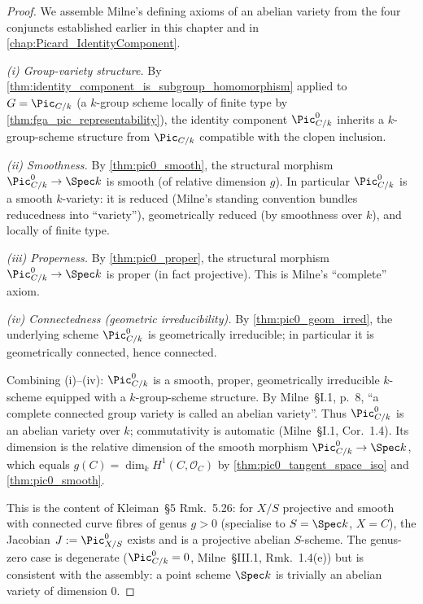\begin{proof}
  We assemble Milne's defining axioms of an abelian variety from the
  four conjuncts established earlier in this chapter and in
  \cref{chap:Picard_IdentityComponent}.

  \emph{(i) Group-variety structure.} By
  \cref{thm:identity_component_is_subgroup_homomorphism} applied to
  \(G = \Pic_{C/k}\) (a \(k\)-group scheme locally of finite type by
  \cref{thm:fga_pic_representability}), the identity component
  \(\Pic^0_{C/k}\) inherits a \(k\)-group-scheme structure from
  \(\Pic_{C/k}\) compatible with the clopen inclusion.

  \emph{(ii) Smoothness.} By \cref{thm:pic0_smooth}, the structural
  morphism \(\Pic^0_{C/k} \to \Spec k\) is smooth (of relative
  dimension \(g\)). In particular \(\Pic^0_{C/k}\) is a smooth
  \(k\)-variety: it is reduced (Milne's standing convention bundles
  reducedness into ``variety''), geometrically reduced (by
  smoothness over \(k\)), and locally of finite type.

  \emph{(iii) Properness.} By \cref{thm:pic0_proper}, the structural
  morphism \(\Pic^0_{C/k} \to \Spec k\) is proper (in fact
  projective). This is Milne's ``complete'' axiom.

  \emph{(iv) Connectedness (geometric irreducibility).} By
  \cref{thm:pic0_geom_irred}, the underlying scheme
  \(\Pic^0_{C/k}\) is geometrically irreducible; in particular it is
  geometrically connected, hence connected.

  Combining (i)--(iv): \(\Pic^0_{C/k}\) is a smooth, proper,
  geometrically irreducible \(k\)-scheme equipped with a
  \(k\)-group-scheme structure. By Milne~\S I.1, p.~8, ``a complete
  connected group variety is called an abelian variety''. Thus
  \(\Pic^0_{C/k}\) is an abelian variety over \(k\); commutativity is
  automatic (Milne~\S I.1, Cor.~1.4). Its dimension is the relative
  dimension of the smooth morphism \(\Pic^0_{C/k} \to \Spec k\),
  which equals \(g(C) = \dim_k H^1(C, \mathcal{O}_C)\) by
  \cref{thm:pic0_tangent_space_iso} and \cref{thm:pic0_smooth}.

  This is the content of Kleiman~\S 5 Rmk.~5.26: for \(X/S\)
  projective and smooth with connected curve fibres of genus
  \(g > 0\) (specialise to \(S = \Spec k\), \(X = C\)), the Jacobian
  \(J := \Pic^0_{X/S}\) exists and is a projective abelian
  \(S\)-scheme. The genus-zero case is degenerate
  (\(\Pic^0_{C/k} = 0\), Milne~\S III.1, Rmk.~1.4(e)) but is
  consistent with the assembly: a point scheme \(\Spec k\) is
  trivially an abelian variety of dimension \(0\).
\end{proof}

